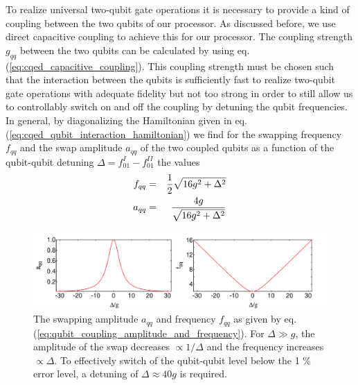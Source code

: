 To realize universal two-qubit gate operations it is necessary to provide a kind of coupling between the two qubits of our processor. As discussed before, we use direct capacitive coupling to achieve this for our processor. The coupling strength $g_{qq}$ between the two qubits can be calculated by using eq. (\ref{eq:cqed_capacitive_coupling}). This coupling strength must be chosen such that the interaction between the qubits is sufficiently fast to realize two-qubit gate operations with adequate fidelity but not too strong in order to still allow us to controllably switch on and off the coupling by detuning the qubit frequencies. In general, by diagonalizing the Hamiltonian given in eq. (\ref{eq:cqed_qubit_interaction_hamiltonian}) we find for the swapping frequency $f_{qq}$ and the swap amplitude $a_{qq}$ of the two coupled qubits as a function of the qubit-qubit detuning $\Delta=f_{01}^I-f_{01}^{II}$ the values
%
\begin{eqnarray}
f_{qq} & = & \frac{1}{2}\sqrt{16g^2+\Delta^2} \notag \\
a_{qq} & = & \frac{4g}{\sqrt{16g^2+\Delta^2}} \label{eq:qubit_coupling_amplitude_and_frequency}
\end{eqnarray}
%

\begin{figure}[ht!]
	\centering
	\includegraphics[width=1\textwidth]{./material/mathematica/qubit_coupling_amplitude_and_frequency}
	\caption[]{The swapping amplitude $a_{qq}$ and frequency $f_{qq}$ as given by eq. (\ref{eq:qubit_coupling_amplitude_and_frequency}). For $\Delta \gg g$, the amplitude of the swap decreases $\propto 1/\Delta$ and the frequency increases $\propto \Delta$. To effectively switch of the qubit-qubit level below the 1 \% error level, a detuning of $\Delta \approx 40 g$ is required.}
	\label{fig:qubit_coupling_amplitude_and_frequency}
\end{figure}

